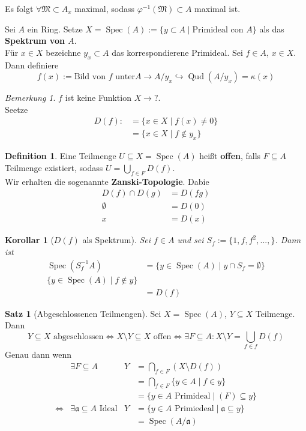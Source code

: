 \documentclass[10pt,a4paper]{article}
\newcommand{\Qud}{\operatorname{Qud}}
\newcommand{\Spec}{\ensuremath{\operatorname{Spec}}}
\newcounter{thm}[section]
\theoremstyle{definition}
\newtheorem{definition}[thm]{Definition}
\newtheorem{satz}[thm]{Satz}
\theoremstyle{plain}
\newtheorem{kor}[thm]{Korollar}
\theoremstyle{remark}
\newtheorem{bem}[thm]{Bemerkung}
\begin{document}
Es folgt $\forall \mathfrak M\subset A_x$ maximal, sodass $\varphi^{-1}(\mathfrak M)\subset A$ maximal ist.\\
\begin{def}
	\label{satz414}
	Sei $A$ ein Ring. Setze $X=\Spec(A):=\{y\subset A\mid\text{Primideal con $A$}\}$ als das \textbf{Spektrum von $A$}.\\
	Für $x\in X$ bezeichne $y_x\subset A$ das korrespondierene Primideal.
	Sei $f\in A$, $x\in X$. Dann definiere
	\[f(x):=\text{Bild von $f$ unter}A\rightarrow A/y_x\hookrightarrow\Qud(A/y_x)=\kappa(x)\]
\end{def}
\begin{bem}
	$f$ ist keine Funktion $X\rightarrow ?$.\\
	Seetze
	\begin{align*}
	D(f):&=\{x\in X\mid f(x)\neq 0\}\\
	&=\{x\in X\mid f\notin y_x\}
	\end{align*}
\end{bem}
\begin{definition}
	Eine Teilmenge $U\subseteq X=\Spec(A)$ heißt \textbf{offen}, falls $F\subseteq A$ Teilmenge existiert, sodass $U=\bigcup_{f\in F}D(f)$.\\
	Wir erhalten die sogenannte \textbf{Zanski-Topologie}.
	Dabie
	\begin{align*}
	D(f)\cap D(g)&=D(fg)\\
	\emptyset&=D(0)\\
	x&=D(x)
	\end{align*} 
\end{definition}
\begin{kor}[$D(f)$ als Spektrum]
	Sei $f\in A$ und sei $S_f:=\{1,f,f^2,...,\}$. Dann ist\begin{align*}
	\Spec(S^{-1}_fA)&=\{y\in\Spec(A)\mid y\cap S_f=\emptyset\}\\
	\{y\in\Spec(A)\mid f\notin y\}\\
	&=D(f)
	\end{align*}
\end{kor}
\begin{satz}[Abgeschlossenen Teilmengen]
	Sei $X=\Spec(A)$, $Y\subseteq X$ Teilmenge. Dann
	\[\text{$Y\subseteq X$ abgeschlossen}
	\Leftrightarrow \text{$X\setminus Y\subseteq X$ offen}
	\Leftrightarrow \exists F\subseteq A:X\setminus Y=\bigcup_{f\in f}D(f)\]
	Genau dann wenn
	\begin{align*}
	&\exists F\subseteq A&Y&=\bigcap_{f\in F}(X\setminus D(f))\\
	&&&=\bigcap_{f\in F}\{y\in A\mid f\in y\}\\
	&&&=\{y\in A\text{ Primideal}\mid(F)\subseteq y\}\\
	\Leftrightarrow&\exists\mathfrak a\subseteq A\text{ Ideal}&Y&=\{y\in A\text{ Primiedeal}\mid\mathfrak a\subseteq y\}\\
	&&&=\Spec(A/\mathfrak a)
	\end{align*}
\end{satz}
\end{document}
